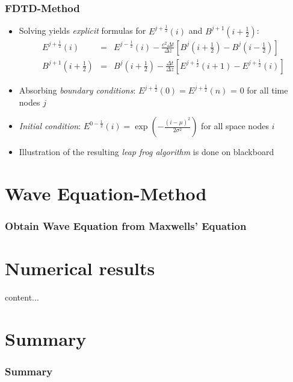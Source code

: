 \documentclass[ignorenonframetext]{beamer}
\begin{document}
\begin{frame}
\frametitle{FDTD-Method}
\begin{itemize}
\item Solving yields \emph{explicit} formulas for $E^{j+\frac{1}{2}}(i)$ and $B^{j+1}(i+\frac{1}{2})$:
\begin{eqnarray}
E^{j+\frac{1}{2}}(i)&=& E^{j-\frac{1}{2}}(i) -  \frac{c^2 \Delta t}{\Delta z} \left[B^j(i+\frac{1}{2}) - B^j(i-\frac{1}{2})\right] \nonumber\\
B^{j+1}(i+\frac{1}{2}) &=& B^{j}(i+\frac{1}{2}) - \frac{\Delta t}{\Delta z}\left[E^{j+\frac{1}{2}}(i+1) - E^{j+\frac{1}{2}}(i)\right]
\end{eqnarray}
\item Absorbing \emph{boundary conditions}: $E^{j+\frac{1}{2}}(0) = E^{j+\frac{1}{2}}(n)$ = 0 for all time nodes $j$
\item \emph{Initial condition}: $E^{0-\frac{1}{2}}(i) = \exp\left(-\frac{(i - \mu)^2}{2 \sigma^2}\right)$ for all space nodes $i$
\item Illustration of the resulting \emph{leap frog algorithm} is done on blackboard 
\end{itemize}
\end{frame}
\section{Wave Equation-Method}
\begin{frame}
\frametitle{Obtain Wave Equation from Maxwells' Equation}
\end{frame}
\section{Numerical results}
\begin{frame}
content...
\end{frame}

\section{Summary}
\begin{frame}
\frametitle{Summary}
\end{frame}
\end{document}
